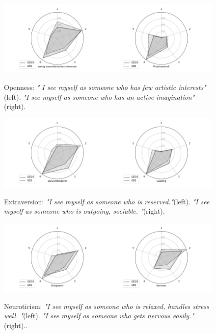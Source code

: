                 \begin{figure}[ht]
                \begin{center}
                   \includegraphics[scale=0.56,angle=0]{fig/Opennessfigure}
	         \label{Openness}
	         \caption{ Openness: \textit{" I see myself as someone who has few artistic interests"}(left). \textit{"I see myself as someone who has an active imagination"}(right).}
                \end{center}
                \end{figure}

                \begin{figure}[ht]
                \begin{center}
                   \includegraphics[scale=0.56,angle=0]{fig/Extraversionfigure}
	         \label{Extraversion}
	         \caption{Extraversion: \textit{"I see myself as someone who is reserved."}(left). \textit{"I see myself as someone who is outgoing, sociable. "}(right).}
                \end{center}
                \end{figure}

                \begin{figure}[ht]
                \begin{center}
                   \includegraphics[scale=0.56,angle=0]{fig/Neuroticismfigure}
	         \label{Neuroticism}
	         \caption{Neuroticism: \textit{"I see myself as someone who is relaxed, handles stress well. "}(left). \textit{"I see myself as someone who gets nervous easily."}(right)..}
                \end{center}
                \end{figure}

